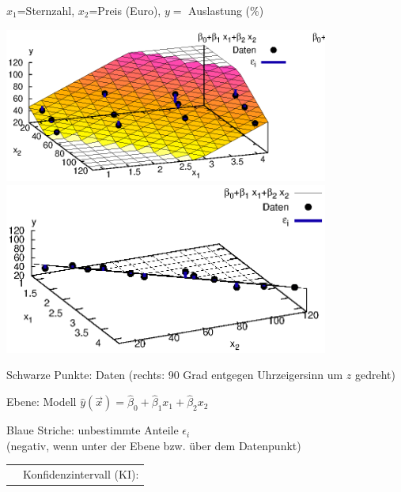 \documentclass[a4paper]{foils}
\begin{document}
\begin{landscape}
\begin{center}
$x_1$=Sternzahl, $x_2$=Preis (Euro), $y=$ Auslastung (\%)

\newpage
\bfsf{}


\hspace{-0.1\textwidth}
\includegraphics[width=0.8\textwidth]{figsRegr/hotel_scatter3d_1.eps}
\hspace{-0.2\textwidth}
\includegraphics[width=0.8\textwidth]{figsRegr/hotel_scatter3d_2.eps}
\hspace{-0.1\textwidth}

\bi
\item Schwarze Punkte: Daten 
(rechts: 90 Grad entgegen Uhrzeigersinn um $z$ gedreht)\\[-1ex]

\item Ebene: Modell 
$\hat{y}(\vec{x})=\hat{\beta}_0+\hat{\beta}_1x_1+\hat{\beta}_2x_2$\\[-1ex]

\item Blaue Striche:  unbestimmte Anteile
$\epsilon_i$\\ (negativ, wenn unter der Ebene bzw. \"uber dem Datenpunkt)
\ei

\newpage
\vspace{0em}
\begin{tabular}{cc}
\parbox{0.7\textwidth}{
\vspace{-5em}
}
&
\parbox{0.6\textwidth}{Konfidenzintervall (KI):

}
\end{tabular}
\end{center}
\end{landscape}
\end{document}
